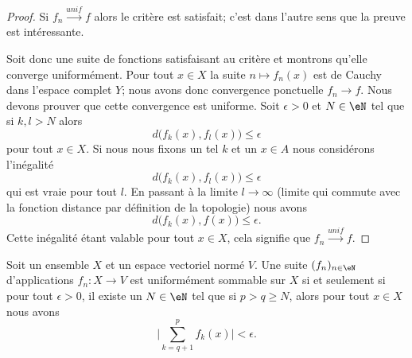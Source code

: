 \begin{proof}
	Si \( f_n\stackrel{unif}{\longrightarrow}f\) alors le critère est satisfait; c'est dans l'autre sens que la preuve est intéressante.

	Soit donc une suite de fonctions satisfaisant au critère et montrons qu'elle converge uniformément. Pour tout \( x\in X\) la suite \( n\mapsto f_n(x)\) est de Cauchy dans l'espace complet \( Y\); nous avons donc convergence ponctuelle \( f_n\to f\). Nous devons prouver que cette convergence est uniforme. Soit \( \epsilon>0\) et \( N\in \eN\) tel que si \( k,l>N\) alors
	\begin{equation}
		d\big( f_k(x),f_l(x) \big)\leq \epsilon
	\end{equation}
	pour tout \( x\in X\). Si nous nous fixons un tel \( k\) et un \( x\in A\) nous considérons l'inégalité
	\begin{equation}
		d\big( f_k(x),f_l(x) \big)\leq \epsilon
	\end{equation}
	qui est vraie pour tout \( l\). En passant à la limite \( l\to\infty\) (limite qui commute avec la fonction distance par définition de la topologie) nous avons
	\begin{equation}
		d\big( f_k(x),f(x) \big)\leq \epsilon.
	\end{equation}
	Cette inégalité étant valable pour tout \( x\in X\), cela signifie que \( f_n\stackrel{unif}{\longrightarrow}f\).
\end{proof}



\begin{proposition}	\label{PROPooEBYWooOXUwry}
	Soit un ensemble \( X\) et un espace vectoriel normé \( V\). Une suite \( (f_n)_{n\in \eN}\) d'applications \(f_n \colon X\to V  \) est uniformément sommable sur \( X\) si et seulement si pour tout \( \epsilon>0\), il existe un \( N\in \eN\) tel que si \( p>q\geq N\), alors pour tout \( x\in X\) nous avons
	\begin{equation}
		\big| \sum_{k=q+1}^pf_k(x) \big|<\epsilon.
	\end{equation}
\end{proposition}

